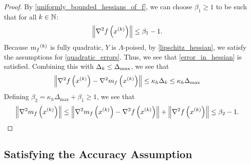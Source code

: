 
\begin{proof}
By \cref{uniformly_bounded_hessians_of_f}, we can choose $\beta_1 \ge 1$ to be such that for all $k \in\mathbb N$:
\begin{align*}
\left\|\nabla^2 f\left(x^{(k)}\right) \right\| \le \beta_1 - 1.
\end{align*}
Because ${{m}_f}^{(k)}$ is fully quadratic, $Y$ is $\Lambda$-poised, by \cref{lipschitz_hessian}, we satisfy the assumptions for \cref{quadratic_errors}.
Thus, we see that \cref{error_in_hessian} is satisfied.
Combining this with $\Delta_k \le {\Delta_{\textrm{max}}}$, we see that
\begin{align*}
\left\|\nabla^2 f\left(x^{(k)}\right) - \nabla^2 m_f\left(x^{(k)}\right) \right\| \le \kappa_{h} \Delta_k \le \kappa_{h} \Delta_{\text{max}}
\end{align*}
Defining $\beta_2 = \kappa_{h} \Delta_{\text{max}} + \beta_1 \ge 1$, we see that
\begin{align*}
\left\|\nabla^2 m_{f}\left(x^{(k)}\right)\right\| \le \left\|\nabla^2 m_{f}\left(x^{(k)}\right) - \nabla^2 f\left(x^{(k)}\right)  \right\| + \left\|\nabla^2 f\left(x^{(k)}\right) \right\|
\le \beta_2 - 1 .
\end{align*}
\end{proof}



\subsection{Satisfying the Accuracy Assumption}
\label{satisfying_accuracy}


